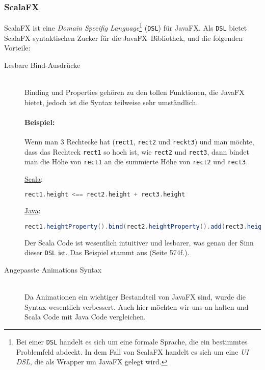 \subsubsection{ScalaFX}
ScalaFX ist eine \textit{Domain Specifig Language}\footnote{Bei einer \texttt{DSL} handelt es sich um eine formale Sprache, die ein bestimmtes Problemfeld abdeckt. In dem Fall von ScalaFX handelt es sich um eine \textit{UI DSL}, die als Wrapper um JavaFX gelegt wird.} (\texttt{DSL}) für JavaFX. Als \texttt{DSL} bietet ScalaFX syntaktischen Zucker für die JavaFX--Bibliothek, und die folgenden Vorteile:

\begin{description}
\item[Lesbare Bind-Ausdrücke]\hfill\\
Binding und Properties gehören zu den tollen Funktionen, die JavaFX bietet, jedoch ist die Syntax teilweise sehr umständlich.
\paragraph{Beispiel:} Wenn man 3 Rechtecke hat (\texttt{rect1}, \texttt{rect2} und \texttt{reckt3}) und man möchte, dass das Rechteck \texttt{rect1} so hoch ist, wie \texttt{rect2} und \texttt{rect3}, dann bindet man die Höhe von \texttt{rect1} an die summierte Höhe von \texttt{rect2} und \texttt{rect3}.

\underline{Scala}:
\begin{lstlisting}[language=scala,caption=Scala Beispiel Code für natürliche Bindings,numbers=none]
rect1.height <== rect2.height + rect3.height
\end{lstlisting}

\underline{Java}:
\begin{lstlisting}[language=Java,caption=Das selbe Beispiel in Java,numbers=none]
rect1.heightProperty().bind(rect2.heightProperty().add(rect3.heightProperty()))
\end{lstlisting}

Der Scala Code ist wesentlich intuitiver und lesbarer, was genau der Sinn dieser \texttt{DSL} ist. Das Beispiel stammt aus \cite{ProJavaFX8} (Seite 574f.).

\item[Angepasste Animations Syntax]\hfill\\
Da Animationen ein wichtiger Bestandteil von JavaFX sind, wurde die Syntax wesentlich verbessert. Auch hier möchten wir uns an \cite{ProJavaFX8} halten und Scala Code mit Java Code vergleichen.


\end{description}
